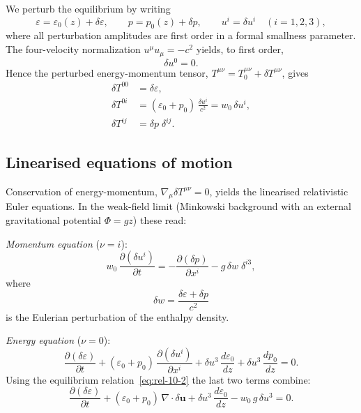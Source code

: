 We perturb the equilibrium by writing
\begin{equation}
\label{eq:rel-10-3}
\varepsilon = \varepsilon_{0}(z) + \delta\varepsilon, \qquad
p = p_{0}(z) + \delta p, \qquad
u^{i} = \delta u^{i} \quad (i=1,2,3),
\end{equation}
where all perturbation amplitudes are first order in a formal smallness
parameter.  The four-velocity normalization $u^{\mu}u_{\mu}=-c^{2}$
yields, to first order,
\begin{equation}
\label{eq:rel-10-4}
\delta u^{0} = 0.
\end{equation}
Hence the perturbed energy-momentum tensor,
$T^{\mu\nu} = T^{\mu\nu}_{0} + \delta T^{\mu\nu}$, gives
\begin{align}
\label{eq:rel-10-5}
\delta T^{00} &= \delta\varepsilon, \\[4pt]
\label{eq:rel-10-6}
\delta T^{0i} &= (\varepsilon_{0}+p_{0})\,\frac{\delta u^{i}}{c^{2}}
  = w_{0}\,\delta u^{i}, \\[4pt]
\label{eq:rel-10-7}
\delta T^{ij} &= \delta p\;\delta^{ij}.
\end{align}

\subsection{Linearised equations of motion}
\label{sec:rel-91-linear}

Conservation of energy-momentum, $\nabla_{\mu}\delta T^{\mu\nu}=0$,
yields the linearised relativistic Euler equations.  In the weak-field
limit (Minkowski background with an external gravitational potential
$\Phi = gz$) these read:

\medskip\noindent
\textit{Momentum equation} ($\nu = i$):
\begin{equation}
\label{eq:rel-10-8}
w_{0}\,\frac{\partial(\delta u^{i})}{\partial t}
= -\frac{\partial(\delta p)}{\partial x^{i}}
  - g\,\delta w\;\delta^{i3},
\end{equation}
where
\begin{equation}
\label{eq:rel-10-9}
\delta w = \frac{\delta\varepsilon + \delta p}{c^{2}}
\end{equation}
is the Eulerian perturbation of the enthalpy density.

\medskip\noindent
\textit{Energy equation} ($\nu = 0$):
\begin{equation}
\label{eq:rel-10-10}
\frac{\partial(\delta\varepsilon)}{\partial t}
+ (\varepsilon_{0}+p_{0})\,\frac{\partial(\delta u^{i})}{\partial x^{i}}
+ \delta u^{3}\,\frac{d\varepsilon_{0}}{dz}
+ \delta u^{3}\,\frac{dp_{0}}{dz}
= 0.
\end{equation}
Using the equilibrium relation~\eqref{eq:rel-10-2} the last two terms
combine:
\begin{equation}
\label{eq:rel-10-11}
\frac{\partial(\delta\varepsilon)}{\partial t}
+ (\varepsilon_{0}+p_{0})\,\nabla\!\cdot\!\delta\boldsymbol{u}
+ \delta u^{3}\,\frac{d\varepsilon_{0}}{dz}
- w_{0}\,g\,\delta u^{3}
= 0.
\end{equation}

